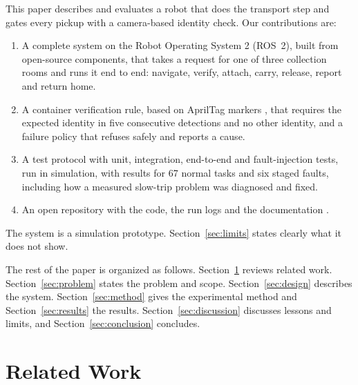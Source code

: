 \documentclass[conference]{IEEEtran}
\begin{document}
This paper describes and evaluates a robot that does the transport step and gates every pickup with a camera-based identity check. Our contributions are:
\begin{enumerate}
\item A complete system on the Robot Operating System 2 (ROS~2), built from open-source components, that takes a request for one of three collection rooms and runs it end to end: navigate, verify, attach, carry, release, report and return home.
\item A container verification rule, based on AprilTag markers \cite{olson2011apriltag}, that requires the expected identity in five consecutive detections and no other identity, and a failure policy that refuses safely and reports a cause.
\item A test protocol with unit, integration, end-to-end and fault-injection tests, run in simulation, with results for 67 normal tasks and six staged faults, including how a measured slow-trip problem was diagnosed and fixed.
\item An open repository with the code, the run logs and the documentation \cite{hcwrepo}.
\end{enumerate}
The system is a simulation prototype. Section~\ref{sec:limits} states clearly what it does not show.

The rest of the paper is organized as follows. Section~\ref{sec:related} reviews related work. Section~\ref{sec:problem} states the problem and scope. Section~\ref{sec:design} describes the system. Section~\ref{sec:method} gives the experimental method and Section~\ref{sec:results} the results. Section~\ref{sec:discussion} discusses lessons and limits, and Section~\ref{sec:conclusion} concludes.

\section{Related Work}\label{sec:related}
\end{document}
